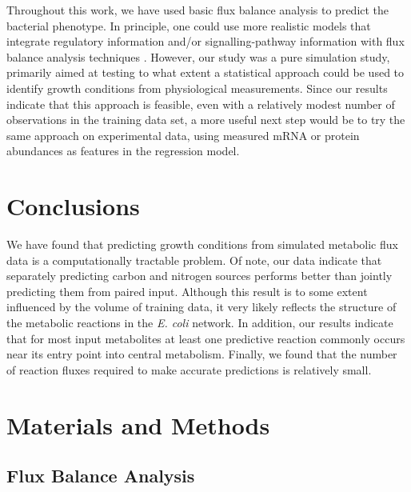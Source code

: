 \documentclass[12pt]{article}
\begin{document}
Throughout this work, we have used basic flux balance analysis to predict the bacterial phenotype. In principle, one could use more realistic models that integrate regulatory information and/or signalling-pathway information with flux balance analysis techniques \cite{CovertPalsson2002,Covertetal2008}. However, our study was a pure simulation study, primarily aimed at testing to what extent a statistical approach could be used to identify growth conditions from physiological measurements. Since our results indicate that this approach is feasible, even with a relatively modest number of observations in the training data set, a more useful next step would be to try the same approach on experimental data, using measured mRNA or protein abundances as features in the regression model.


\section{Conclusions}

We have found that predicting growth conditions from simulated metabolic flux data is a computationally tractable problem. Of note, our data indicate that separately predicting carbon and nitrogen sources performs better than jointly predicting them from paired input. Although this result is to some extent influenced by the volume of training data, it very likely reflects the structure of the metabolic reactions in the \emph{E. coli} network. In addition, our results indicate that for most input metabolites at least one predictive reaction commonly occurs near its entry point into central metabolism. Finally, we found that the number of reaction fluxes required to make accurate predictions is relatively small.


\section{Materials and Methods}

\subsection{Flux Balance Analysis} 
\end{document}
